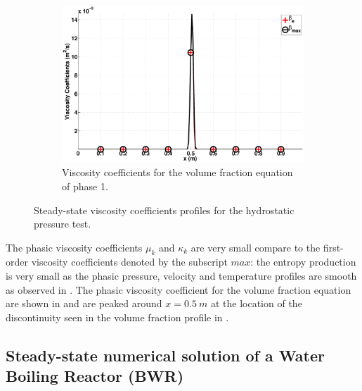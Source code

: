 \documentclass[preprint,10pt]{elsarticle}
\begin{document}
\begin{figure}[H]
        \begin{subfigure}[b]{0.495\textwidth}
                \centering
                \includegraphics[width=\textwidth]{figures/hydrostatic-_liquid_beta.eps}
                \caption{Viscosity coefficients for the volume fraction equation of phase 1.}
                \label{fig:hydrostatic--beta}
        \end{subfigure}        
        \caption{Steady-state viscosity coefficients profiles for the hydrostatic pressure test.}\label{fig:hydrostatic--visc-coeff}
\end{figure}
%
The phasic viscosity coefficients $\mu_k$ and $\kappa_k$ are very small compare to the first-order viscosity coefficients denoted by the subscript $max$: the entropy production is very small as the phasic pressure, velocity and temperature profiles are smooth as observed in . The phasic viscosity coefficient for the volume fraction equation are shown in  and are peaked around $x=0.5 \ m$ at the location of the discontinuity seen in the volume fraction profile in .
  
%
\subsection{Steady-state numerical solution of a Water Boiling Reactor (BWR)}\label{sec:bwr}
%
 
%
\end{document}
